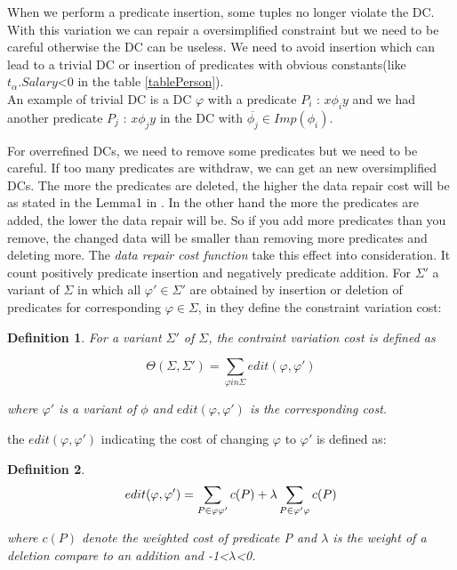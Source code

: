 \documentclass[letterpaper, 12pt]{report}
\newtheorem{mydef}{Definition}
\begin{document}
When we perform a predicate insertion, some tuples no longer violate the DC. With this variation we can repair a oversimplified constraint but we need to be careful otherwise the DC can be useless. We need to avoid insertion which can lead to a trivial DC or insertion of predicates with obvious constants(like $t_\alpha.Salary$<0 in the table \ref{tablePerson}). \\

An example of trivial DC is a DC $\varphi$ with a predicate $P_i$ : $x \phi_i y$ and we had another predicate $P_j$ : $x \phi_j y$ in the DC with $\overline{\phi_j} \in Imp(\phi_i)$. 

For overrefined DCs, we need to remove some predicates but we need to be careful. If too many predicates are withdraw, we can get an new oversimplified DCs. The more the predicates are deleted, the higher the data repair cost will be as stated in the Lemma1 in \cite{main}. In the other hand the more the predicates are added, the lower the data repair will be. So if you add more predicates than you remove, the changed data will be smaller than removing more predicates and deleting more. The \emph{data repair cost function} take this effect into consideration. It count positively predicate insertion and negatively predicate addition. For $\Sigma '$ a variant of $\Sigma$ in which all $\varphi ' \in \Sigma '$ are obtained by insertion or deletion of predicates for corresponding $\varphi \in \Sigma$, in \cite{main} they define the constraint variation cost:

\begin{mydef}
For a variant $\Sigma '$ of $\Sigma$, the contraint variation cost is defined as

$$\Theta (\Sigma,\Sigma ') = \sum_{\varphi in \Sigma} edit(\varphi,\varphi ')$$

\hspace*{2cm} where $\varphi '$ is a variant of $\phi$ and $edit(\varphi,\varphi ')$ is the corresponding cost.
\end{mydef}

the $edit(\varphi , \varphi ')$ indicating the cost of changing $\varphi$ to $\varphi'$ is defined as:
\begin{mydef}
$$
 edit(\varphi, \varphi') = \sum_{P \in \varphi \\ \varphi'} c(P) + \lambda \sum_{P \in \varphi' \\ \varphi} c(P)$$
 
where $c(P)$ denote the weighted cost of predicate P and $\lambda$ is the weight of a deletion compare to an addition and -1<$\lambda$<0.
\end{mydef}
\end{document}
